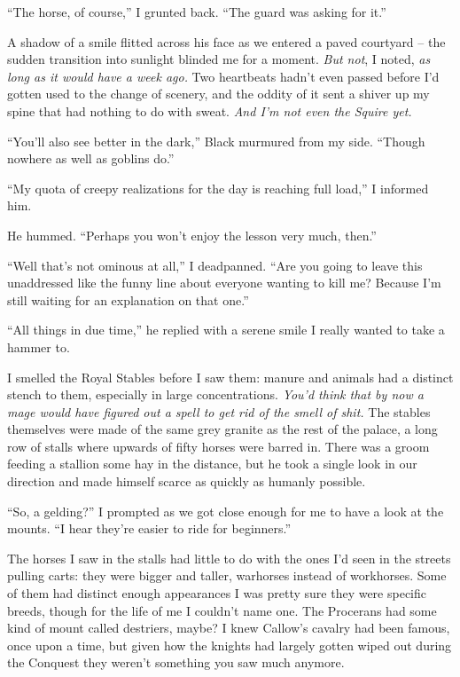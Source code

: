 \documentclass[12pt, openany]{book}
\begin{document}
“The horse, of course,” I grunted back. “The guard was asking for it.”

A shadow of a smile flitted across his face as we entered a paved courtyard – the sudden transition into sunlight blinded me for a moment. \textit{But not}, I noted, \textit{as long as it would have a week ago.} Two heartbeats hadn’t even passed before I’d gotten used to the change of scenery, and the oddity of it sent a shiver up my spine that had nothing to do with sweat. \textit{And I’m not even the Squire yet.}

“You’ll also see better in the dark,” Black murmured from my side. “Though nowhere as well as goblins do.”

“My quota of creepy realizations for the day is reaching full load,” I informed him. 

He hummed. “Perhaps you won’t enjoy the lesson very much, then.”

“Well that’s not ominous at all,” I deadpanned. “Are you going to leave this unaddressed like the funny line about everyone wanting to kill me? Because I’m still waiting for an explanation on that one.”

“All things in due time,” he replied with a serene smile I really wanted to take a hammer to.

I smelled the Royal Stables before I saw them: manure and animals had a distinct stench to them, especially in large concentrations. \textit{You’d think that by now a mage would have figured out a spell to get rid of the smell of shit.} The stables themselves were made of the same grey granite as the rest of the palace, a long row of stalls where upwards of fifty horses were barred in. There was a groom feeding a stallion some hay in the distance, but he took a single look in our direction and made himself scarce as quickly as humanly possible.

“So, a gelding?” I prompted as we got close enough for me to have a look at the mounts. “I hear they’re easier to ride for beginners.”

The horses I saw in the stalls had little to do with the ones I’d seen in the streets pulling carts: they were bigger and taller, warhorses instead of workhorses. Some of them had distinct enough appearances I was pretty sure they were specific breeds, though for the life of me I couldn’t name one. The Procerans had some kind of mount called destriers, maybe? I knew Callow’s cavalry had been famous, once upon a time, but given how the knights had largely gotten wiped out during the Conquest they weren’t something you saw much anymore.
\end{document}
